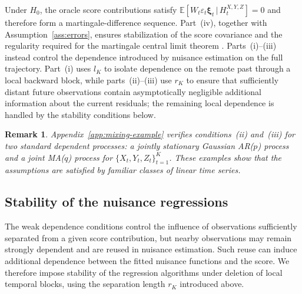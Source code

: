 \documentclass[12pt]{article}
\def\E{\mathbb{E}}
\newtheorem{remark}[theorem]{Remark}
\newcommand\given{\,|\,}
\numberwithin{equation}{section}
\begin{document}
Under \(H_0\), the oracle score contributions satisfy \(\E[W_t\varepsilon_t\boldsymbol\xi_t\given H_t^{X,Y,Z}]=0\) and therefore form a martingale-difference sequence. Part~(iv), together with Assumption~\ref{ass:errors}, ensures stabilization of the score covariance and the regularity required for the martingale central limit theorem \citep{dvoretzky1972asymptotic}. Parts~(i)--(iii) instead control the dependence introduced by nuisance estimation on the full trajectory. Part~(i) uses \(l_K\) to isolate dependence on the remote past through a local backward block, while parts~(ii)--(iii) use \(r_K\) to ensure that sufficiently distant future observations contain asymptotically negligible additional information about the current residuals; the remaining local dependence is handled by the stability conditions below.

\begin{remark}
\label{rem:example-mixing}
Appendix~\ref{app:mixing-example} verifies conditions~(ii) and~(iii) for two
standard dependent processes: a jointly stationary Gaussian AR(\(p\)) process
and a joint MA(\(q\)) process for \(\{X_t,Y_t,Z_t\}_{t=1}^K\). These examples
show that the assumptions are satisfied by familiar classes of linear time
series.
\end{remark}

\subsection{Stability of the nuisance regressions}
\label{sec:stability}

The weak dependence conditions control the influence of observations sufficiently separated from a given score contribution, but nearby observations may remain strongly dependent and are reused in nuisance estimation. Such reuse can induce additional dependence between the fitted nuisance functions and the score. We therefore impose stability of the regression algorithms under deletion of local temporal blocks, using the separation length \(r_K\) introduced above.
\end{document}
